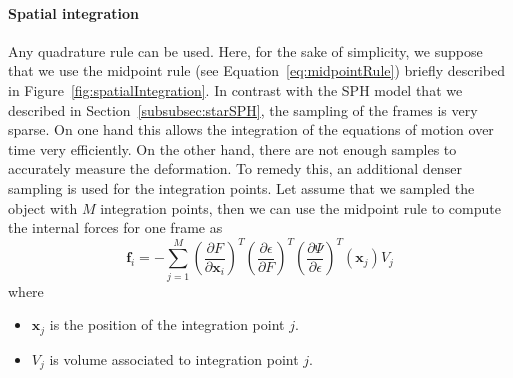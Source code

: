 \paragraph{Spatial integration}

Any quadrature rule can be used. Here, for the sake of simplicity, we suppose that we use the midpoint rule (see Equation~\eqref{eq:midpointRule}) briefly described in Figure~\ref{fig:spatialIntegration}.
In contrast with the SPH model that we described in Section~\ref{subsubsec:starSPH}, the sampling of the frames is very sparse.
On one hand this allows the integration of the equations of motion over time very efficiently. 
On the other hand, there are not enough samples to accurately measure the deformation.
To remedy this, an additional denser sampling is used for the integration points.
Let assume that we sampled the object with $M$ integration points, then we can use the midpoint rule to compute the internal forces for one frame as
\begin{equation}
\label{eq:frameForceComputation}
\displaystyle
\mathbf{f}_{i} =
- \sum_{j=1}^{M}
\left( \frac{\partial F}{\partial \mathbf{x}_{i}} \right)^{T}
\left( \frac{\partial \epsilon}{\partial F} \right)^{T}
\left( \frac{\partial \Psi}{\partial \epsilon} \right)^{T} \left(\mathbf{x}_{j}\right) V_{j} 
\end{equation}
where 
\begin{itemize}
\item $\mathbf{x}_{j}$ is the position of the integration point $j$.
\item $V_{j}$ is volume associated to integration point $j$.
\end{itemize}


